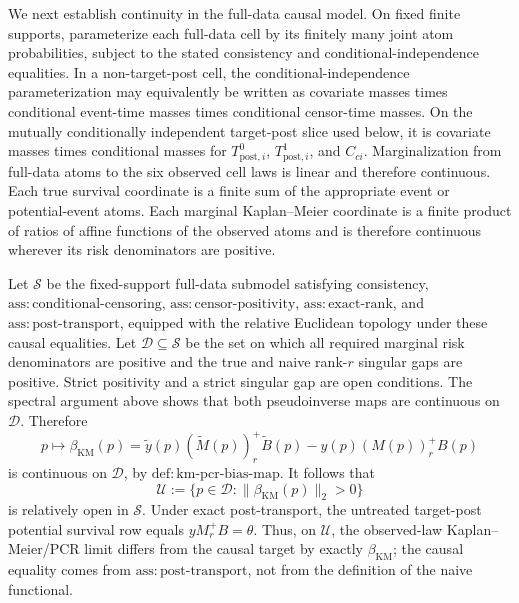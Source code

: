 We next establish continuity in the full-data causal model. On fixed finite supports, parameterize each full-data cell by its finitely many joint atom probabilities, subject to the stated consistency and conditional-independence equalities. In a non-target-post cell, the conditional-independence parameterization may equivalently be written as covariate masses times conditional event-time masses times conditional censor-time masses. On the mutually conditionally independent target-post slice used below, it is covariate masses times conditional masses for \(T^{0}_{\mathrm{post},i}\), \(T^{1}_{\mathrm{post},i}\), and \(C_{ci}\). Marginalization from full-data atoms to the six observed cell laws is linear and therefore continuous. Each true survival coordinate is a finite sum of the appropriate event or potential-event atoms. Each marginal Kaplan--Meier coordinate is a finite product of ratios of affine functions of the observed atoms and is therefore continuous wherever its risk denominators are positive.

Let \(\mathcal S\) be the fixed-support full-data submodel satisfying consistency, \(\mathrm{ass{:}conditional\mbox{-}censoring}\), \(\mathrm{ass{:}censor\mbox{-}positivity}\), \(\mathrm{ass{:}exact\mbox{-}rank}\), and \(\mathrm{ass{:}post\mbox{-}transport}\), equipped with the relative Euclidean topology under these causal equalities. Let \(\mathcal D\subseteq\mathcal S\) be the set on which all required marginal risk denominators are positive and the true and naive rank-\(r\) singular gaps are positive. Strict positivity and a strict singular gap are open conditions. The spectral argument above shows that both pseudoinverse maps are continuous on \(\mathcal D\). Therefore
\[
p\longmapsto\beta_{\mathrm{KM}}(p)
=\widetilde y(p)(\widetilde M(p))_r^+\widetilde B(p)
-y(p)(M(p))_r^+B(p)
\]
is continuous on \(\mathcal D\), by \(\mathrm{def{:}km\mbox{-}pcr\mbox{-}bias\mbox{-}map}\). It follows that
\[
\mathcal U:=\{p\in\mathcal D:\|\beta_{\mathrm{KM}}(p)\|_2>0\}
\]
is relatively open in \(\mathcal S\). Under exact post-transport, the untreated target-post potential survival row equals \(yM_r^+B=\theta\). Thus, on \(\mathcal U\), the observed-law Kaplan--Meier/PCR limit differs from the causal target by exactly \(\beta_{\mathrm{KM}}\); the causal equality comes from \(\mathrm{ass{:}post\mbox{-}transport}\), not from the definition of the naive functional.

